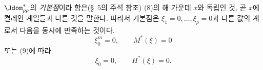 
$\Jdom^*_{\rho\rho}$의 \emph{기본점}이라 함은(\S\ 5의 주석 참조) (8)의 해 가운데 $x$와 독립인 것, 곧 $x$에 켤레인 계열들과 다른 것을 말한다. 따라서 기본점은 $\xi_1=0,\ldots,\xi_\rho=0$과 다른 값의 계로서 다음을 동시에 만족하는 것이다.
\[
\xi_0^m=0,
\qquad M^*(\xi)=0
\]
또는 (9)에 따라
\[
\xi_0=0,
\qquad H^*(\xi)=0.
\]
